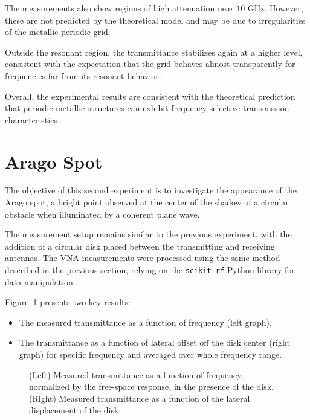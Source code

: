 \documentclass{article}
\begin{document}
The measurements also show regions of high attenuation near \(10\) GHz. However, these are not predicted by the theoretical model and may be due to irregularities of the metallic periodic grid.

Outside the resonant region, the transmittance stabilizes again at a higher level, consistent with the expectation that the grid behaves almost transparently for frequencies far from its resonant behavior.

Overall, the experimental results are consistent with the theoretical prediction that periodic metallic structures can exhibit frequency-selective transmission characteristics.


\section{Arago Spot}
\label{sec:Arago-spot}

The objective of this second experiment is to investigate the appearance of the Arago spot, a bright point observed at the center of the shadow of a circular obstacle when illuminated by a coherent plane wave.

The measurement setup remains similar to the previous experiment, with the addition of a circular disk placed between the transmitting and receiving antennas. The VNA measurements were processed using the same method described in the previous section, relying on the \texttt{scikit-rf} Python library for data manipulation.

Figure~\ref{fig:arago-spot-results} presents two key results:
\begin{itemize}
    \item The measured transmittance as a function of frequency (left graph),
    \item The transmittance as a function of lateral offset off the disk center (right graph) for specific frequency and averaged over whole frequency range.
\end{itemize}

\begin{figure}[H]
\centering

\hfill

\caption{(Left) Measured transmittance as a function of frequency, normalized by the free-space response, in the presence of the disk. (Right) Measured transmittance as a function of the lateral displacement of the disk.}
\label{fig:arago-spot-results}
\end{figure}
\end{document}

